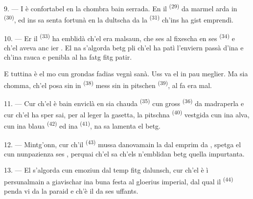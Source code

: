 9. --- I è confortabel en la chombra bain serrada. En il 
\textsuperscript{(29)} da marmel arda in  \textsuperscript{(30)}, ed
ins sa senta fortunà en la dultscha  da la 
\textsuperscript{(31)} ch'ins ha gist emprendì.

\VUsaut{4.2mm}
\VUsaut{3.0mm}

10. --- Er il  \textsuperscript{(33)} ha emblidà ch'el era malsaun, che
ses  al fixescha en ses  \textsuperscript{(34)} e
ch'el aveva anc ier . El na s'algorda betg pli ch'el ha
patì l'enviern passà d'ina  e ch'ina  rauca e
penibla al ha fatg fitg patir.

E tuttina è el mo cun grondas fadias vegnì sanà. Uss va el in pau meglier. Ma sia
chomma, ch'el posa sin in  \textsuperscript{(38)} mess sin in
pitschen  \textsuperscript{(39)}, al fa era mal.

11. --- Cur ch'el è bain enviclà en sia chauda 
\textsuperscript{(35)} cun gross  \textsuperscript{(36)} da
madraperla e cur ch'el ha sper sai, per al leger la gasetta, la pitschna
 \textsuperscript{(40)} vestgida cun ina  alva, cun ina
blaua  \textsuperscript{(42)} ed ina 
\textsuperscript{(41)}, na sa lamenta el betg.

12. --- Mintg'onn, cur ch'il  \textsuperscript{(43)} mussa danovamain
la  dal emprim da , spetga el cun nunpazienza ses
, perquai ch'el sa ch'els n'emblidan betg quella 
impurtanta.

13. --- El s'algorda cun emoziun dal temp fitg dalunsch, cur ch'el è ì persunalmain
a giavischar ina buna festa al gloerius  imperial, dal qual il
 \textsuperscript{(44)} penda vi da la paraid e ch'è il
 da ses uffants.

\VUsaut{6.0mm}
\VUfilet{22mm}
